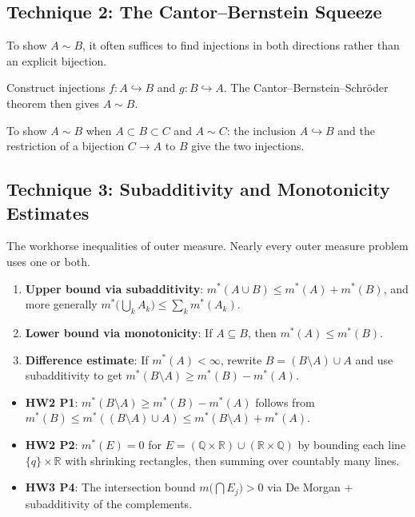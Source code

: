 \documentclass[11pt]{report}
\begin{document}
\subsection{Technique 2: The Cantor--Bernstein Squeeze}

To show $A \sim B$, it often suffices to find injections in both directions rather than an explicit bijection.

\begin{rembox}[Strategy]
Construct injections $f: A \hookrightarrow B$ and $g: B \hookrightarrow A$. The Cantor--Bernstein--Schr\"oder theorem then gives $A \sim B$.
\end{rembox}

\begin{exbox}[Application (HW1)]
To show $A \sim B$ when $A \subset B \subset C$ and $A \sim C$: the inclusion $A \hookrightarrow B$ and the restriction of a bijection $C \to A$ to $B$ give the two injections.
\end{exbox}

\subsection{Technique 3: Subadditivity and Monotonicity Estimates}

The workhorse inequalities of outer measure. Nearly every outer measure problem uses one or both.

\begin{rembox}[Strategy]
\begin{enumerate}[label=(\roman*)]
\item \textbf{Upper bound via subadditivity}: $m^*(A \cup B) \leq m^*(A) + m^*(B)$, and more generally $m^*\!\bigl(\bigcup_k A_k\bigr) \leq \sum_k m^*(A_k)$.
\item \textbf{Lower bound via monotonicity}: If $A \subseteq B$, then $m^*(A) \leq m^*(B)$.
\item \textbf{Difference estimate}: If $m^*(A) < \infty$, rewrite $B = (B \setminus A) \cup A$ and use subadditivity to get $m^*(B \setminus A) \geq m^*(B) - m^*(A)$.
\end{enumerate}
\end{rembox}

\begin{exbox}
\begin{itemize}
\item \textbf{HW2 P1}: $m^*(B \setminus A) \geq m^*(B) - m^*(A)$ follows from $m^*(B) \leq m^*((B \setminus A) \cup A) \leq m^*(B \setminus A) + m^*(A)$.
\item \textbf{HW2 P2}: $m^*(E) = 0$ for $E = (\mathbb{Q} \times \mathbb{R}) \cup (\mathbb{R} \times \mathbb{Q})$ by bounding each line $\{q\} \times \mathbb{R}$ with shrinking rectangles, then summing over countably many lines.
\item \textbf{HW3 P4}: The intersection bound $m\!\bigl(\bigcap E_j\bigr) > 0$ via De Morgan + subadditivity of the complements.
\end{itemize}
\end{exbox}
\end{document}
